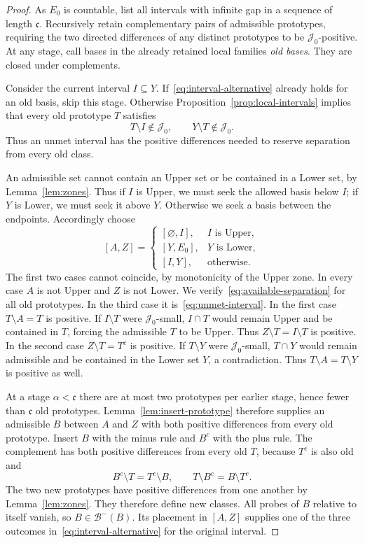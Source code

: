 \begin{proof}
As $E_0$ is countable, list all intervals with infinite gap in a sequence
of length $\mathfrak c$.
Recursively retain complementary pairs of admissible prototypes, requiring
the two directed differences of any distinct prototypes to be
$\mathcal J_0$-positive.
At any stage, call bases in the already retained local families
\emph{old bases}.
They are closed under complements.

Consider the current interval $I\subseteq Y$.
If~\eqref{eq:interval-alternative} already holds for an old basis,
skip this stage. Otherwise Proposition~\ref{prop:local-intervals}
implies that every old prototype $T$ satisfies
\begin{equation}\label{eq:unmet-interval}
 T\setminus I\notin\mathcal J_0,
 \qquad Y\setminus T\notin\mathcal J_0.
\end{equation}
Thus an unmet interval has the positive differences needed to reserve
separation from every old class.

An admissible set cannot contain an Upper set or be contained in a Lower
set, by Lemma~\ref{lem:zones}. Thus if $I$ is Upper, we must seek the
allowed basis below $I$; if $Y$ is Lower, we must seek it above $Y$.
Otherwise we seek a basis between the endpoints. Accordingly choose
\[
 [A,Z]=
 \begin{cases}
 [\varnothing,I],& I\text{ is Upper},\\
 [Y,E_0],&Y\text{ is Lower},\\
 [I,Y],&\text{otherwise}.
 \end{cases}
\]
The first two cases cannot coincide, by monotonicity of the Upper zone.
In every case $A$ is not Upper and $Z$ is not Lower.
We verify~\eqref{eq:available-separation} for all old prototypes.
In the third case it is~\eqref{eq:unmet-interval}.
In the first case $T\setminus A=T$ is positive.
If $I\setminus T$ were $\mathcal J_0$-small, $I\cap T$ would remain Upper and be
contained in $T$, forcing the admissible $T$ to be Upper.
Thus $Z\setminus T=I\setminus T$ is positive.
In the second case $Z\setminus T=T^c$ is positive.
If $T\setminus Y$ were $\mathcal J_0$-small, $T\cap Y$ would remain admissible and be
contained in the Lower set $Y$, a contradiction.
Thus $T\setminus A=T\setminus Y$ is positive as well.

At a stage $\alpha<\mathfrak c$ there are at most two prototypes per
earlier stage, hence fewer than $\mathfrak c$ old prototypes.
Lemma~\ref{lem:insert-prototype} therefore supplies an admissible $B$
between $A$ and $Z$ with both positive differences from every old
prototype.
Insert $B$ with the minus rule and $B^c$ with the plus rule.
The complement has both positive differences from every old $T$, because
$T^c$ is also old and
\[
 B^c\setminus T=T^c\setminus B,\qquad
 T\setminus B^c=B\setminus T^c.
\]
The two new prototypes have positive differences from one another by
Lemma~\ref{lem:zones}.
They therefore define new classes.
All probes of $B$ relative to itself vanish, so $B\in\mathcal B^-(B)$.
Its placement in $[A,Z]$ supplies one of the three outcomes
in~\eqref{eq:interval-alternative} for the original interval.


\end{proof}

